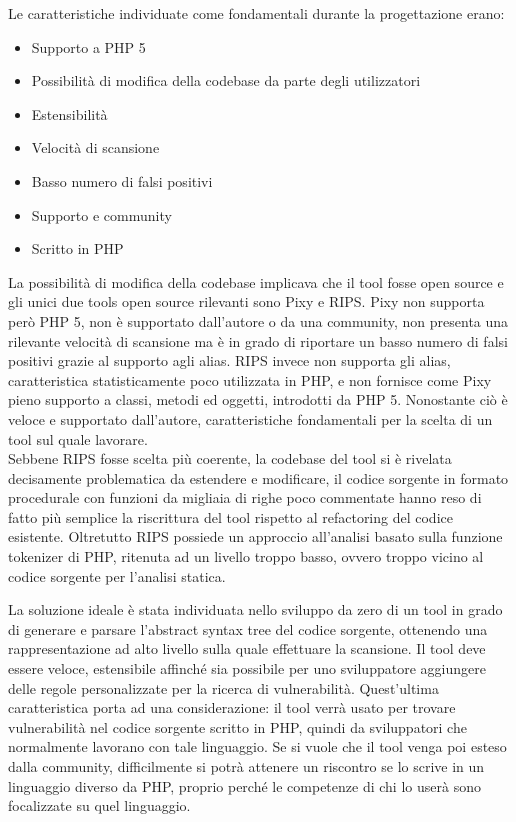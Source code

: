Le caratteristiche individuate come fondamentali durante la progettazione erano:
\begin{itemize}
\item Supporto a PHP 5
\item Possibilità di modifica della codebase da parte degli utilizzatori
\item Estensibilità
\item Velocità di scansione
\item Basso numero di falsi positivi
\item Supporto e community
\item Scritto in PHP
\end{itemize}
La possibilità di modifica della codebase implicava che il tool fosse open source e gli unici due tools open source rilevanti sono Pixy e RIPS.
Pixy non supporta però PHP 5, non è supportato dall'autore o da una community, non presenta una rilevante velocità di scansione ma è in grado di riportare un basso numero di falsi positivi grazie al supporto agli alias.
RIPS invece non supporta gli alias, caratteristica statisticamente poco utilizzata in PHP, e non fornisce come Pixy pieno supporto a classi, metodi ed oggetti, introdotti da PHP 5. Nonostante ciò è veloce e supportato dall'autore, caratteristiche fondamentali per la scelta di un tool sul quale lavorare.\\
Sebbene RIPS fosse scelta più coerente, la codebase del tool si è rivelata decisamente problematica da estendere e modificare, il codice sorgente in formato procedurale con funzioni da migliaia di righe poco commentate hanno reso di fatto più semplice la riscrittura del tool rispetto al refactoring del codice esistente. Oltretutto RIPS possiede un approccio all'analisi basato sulla funzione tokenizer di PHP, ritenuta ad un livello troppo basso, ovvero troppo vicino al codice sorgente per l'analisi statica.

La soluzione ideale è stata individuata nello sviluppo da zero di un tool in grado di generare e parsare l'abstract syntax tree del codice sorgente, ottenendo una rappresentazione ad alto livello sulla quale effettuare la scansione. Il tool deve essere veloce, estensibile affinché sia possibile per uno sviluppatore aggiungere delle regole personalizzate per la ricerca di vulnerabilità. Quest'ultima caratteristica porta ad una considerazione: il tool verrà usato per trovare vulnerabilità nel codice sorgente scritto in PHP, quindi da sviluppatori che normalmente lavorano con tale linguaggio. Se si vuole che il tool venga poi esteso dalla community, difficilmente si potrà attenere un riscontro se lo scrive in un linguaggio diverso da PHP, proprio perché le competenze di chi lo userà sono focalizzate su quel linguaggio.

